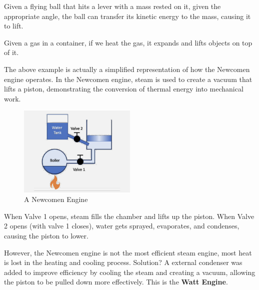 \documentclass[11pt]{report}
\begin{document}
\begin{example}
    Given a flying ball that hits a lever with a mass rested on it, given the appropriate angle, the ball can transfer its kinetic energy to the mass, causing it to lift.
\end{example}

\begin{example}[Heat]
    Given a gas in a container, if we heat the gas, it expands and lifts objects on top of it.
\end{example}
\begin{shaded}
\begin{example}
    The above example is actually a simplified representation of how the Newcomen engine operates. In the Newcomen engine, steam is used to create a vacuum that lifts a piston, demonstrating the conversion of thermal energy into mechanical work.
\end{example}
\end{shaded}
\begin{figure}[h!]
    \centering
    \includegraphics[width=0.5\textwidth]{newcomen_engine.png}
    \caption{A Newcomen Engine}
\end{figure}
When Valve 1 opens, steam fills the chamber and lifts up the piston. When Valve 2 opens (with valve 1 closes),
water gets sprayed, evaporates, and condenses, causing the piston to lower.

However, the Newcomen engine is not the most efficient steam engine, most heat is lost in the heating and cooling process. Solution? A external condenser was added to improve efficiency by cooling the steam and creating a vacuum, allowing the piston to be pulled down more effectively. This is the \textbf{Watt Engine}.
\end{document}
